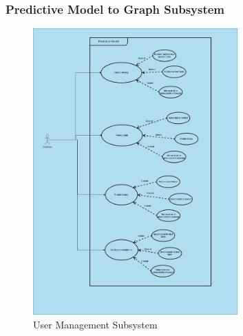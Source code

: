 \documentclass[11pt,a4paper]{article}
\begin{document}
\subsubsection*{Predictive Model to Graph Subsystem}
\begin{figure}[htbp]
    \centering
    \includegraphics[width=0.7\textwidth]{Predictive_Model_Use_Case.jpg}
    \caption{User Management Subsystem}
\end{figure}
\pagebreak
\end{document}
